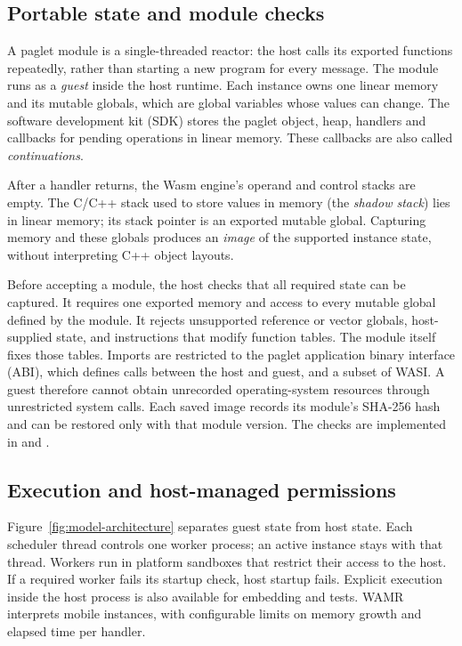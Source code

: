 
\subsection{Portable state and module checks}\label{sec:model-instance}

A paglet module is a single-threaded  reactor: the
host calls its exported functions repeatedly, rather than starting a new
program for every message. The module runs as a \emph{guest} inside the
host runtime. Each instance owns one linear memory and its mutable
globals, which are global variables whose values can change. The software
development kit (SDK) stores the paglet object, heap, handlers and
callbacks for pending operations in linear memory. These callbacks are
also called \emph{continuations}.

After a handler returns, the Wasm engine's operand and control stacks are
empty. The C/C++ stack used to store values in memory (the \emph{shadow
stack}) lies in linear memory; its stack pointer is an exported mutable
global. Capturing memory and these globals produces an \emph{image} of the
supported instance state, without interpreting C++ object layouts.

Before accepting a module, the host checks that all required state can
be captured. It requires one exported memory and access to every mutable
global defined by the module. It rejects unsupported reference or vector
globals, host-supplied state, and instructions that modify function
tables. The module itself fixes those tables. Imports are restricted to
the paglet application binary interface (ABI), which defines calls between
the host and guest, and a subset of WASI. A guest therefore cannot obtain
unrecorded operating-system resources through unrestricted system calls.
Each saved image records its module's SHA-256 hash and can be restored
only with that module version. The checks are implemented in
 and
.

\subsection{Execution and host-managed permissions}\label{sec:model-capabilities}

Figure~\ref{fig:model-architecture} separates guest state from host state.
Each scheduler thread controls one worker process; an active instance
stays with that thread. Workers run in platform sandboxes that restrict
their access to the host. If a required worker fails its startup check,
host startup fails. Explicit execution inside the host process is also
available for embedding and tests. WAMR interprets mobile instances, with
configurable limits on memory growth and elapsed time per handler.

